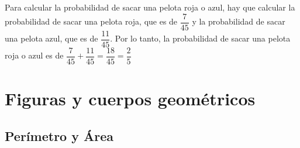 \documentclass[12pt,addpoints,answers]{repaso}
\begin{document}
\begin{questions}
{\begin{parts}
        \begin{solutionbox}{2.5cm}
            Para calcular la probabilidad de sacar una pelota roja o azul, hay que calcular la probabilidad de sacar una pelota roja, que es de $\dfrac{7}{45}$ y la probabilidad de sacar una pelota azul, que es de $\dfrac{11}{45}$. Por lo tanto, la probabilidad de sacar una pelota roja o azul es de $\dfrac{7}{45}+\dfrac{11}{45}=\dfrac{18}{45}=\dfrac{2}{5}$
        \end{solutionbox}






    \end{parts}
    }

    \newpage

    \section{ Figuras y cuerpos geométricos}

    \subsection{Perímetro y Área}
   
\end{questions}
\end{document}
